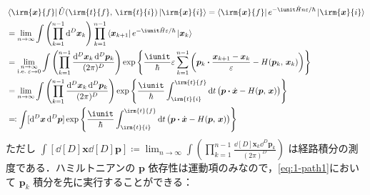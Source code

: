 \documentclass[TQFT_main]{subfiles}
\begin{document}
\begin{align}
    &\bra{\irm{\bm{x}}{f}} \hat{U}(\irm{t}{f},\, \irm{t}{i}) \ket{\irm{\bm{x}}{i}} 
    = \bra{\irm{\bm{x}}{f}} e^{-\iunit \hat{H}n\varepsilon /\hbar} \ket{\irm{\bm{x}}{i}} \\
    &= \lim_{n\to \infty}\int \left(\prod_{k=1}^{n-1} \dd[D]{\bm{x}_k} \right) \prod_{k=1}^{n-1} \bra{\bm{x}_{k+1}} e^{-\iunit \hat{H} \varepsilon / \hbar} \ket{\bm{x}_k} \\
    &= \lim_{\substack{n\to \infty \\ \mathrm{i.e.}\; \varepsilon \to 0}}\int \left(\prod_{k=1}^{n-1}  \frac{\dd[D]{\bm{x}_k}\dd^D \bm{p}_k}{(2\pi)^D} \right) \exp\left\{ \frac{\iunit}{\hbar} \varepsilon \sum_{k=1}^{n-1} \left(\bm{p}_k \vdot \frac{\bm{x}_{k+1} - \bm{x}_k }{\varepsilon} - H (\bm{p}_k,\, \bm{x}_k) \right)  \right\}  \label{eq:1-path1} \\ 
    &= \lim_{n\to \infty}\int \left(\prod_{k=1}^{n-1}  \frac{\dd[D]{\bm{x}_k}\dd^D \bm{p}_k}{(2\pi)^D} \right) \exp\left\{ \frac{\iunit}{\hbar} \int_{\irm{t}{i}}^{\irm{t}{f}} \dd{t} \bigl(\bm{p} \vdot \dot{\bm{x}} - H (\bm{p},\, \bm{x}) \bigr)  \right\} \\
    &\eqqcolon \int [\dd[D]{\bm{x}} \dd[D]{\bm{p}}] \exp\left\{ \frac{\iunit}{\hbar} \int_{\irm{t}{i}}^{\irm{t}{f}} \dd{t} \bigl(\bm{p} \vdot \dot{\bm{x}} - H (\bm{p},\, \bm{x}) \bigr)  \right\}
\end{align}
ただし $\int [\dd[D]{\bm{x}} \dd[D]{\bm{p}}] \coloneqq \lim_{n\to \infty}\int \left(\prod_{k=1}^{n-1}  \frac{\dd[D]{\bm{x}_k}\dd^D \bm{p}_k}{(2\pi)^D} \right)$ は経路積分の測度である．ハミルトニアンの $\bm{p}$ 依存性は運動項のみなので，\eqref{eq:1-path1}において $\bm{p}_k$ 積分を先に実行することができる：
\end{document}
